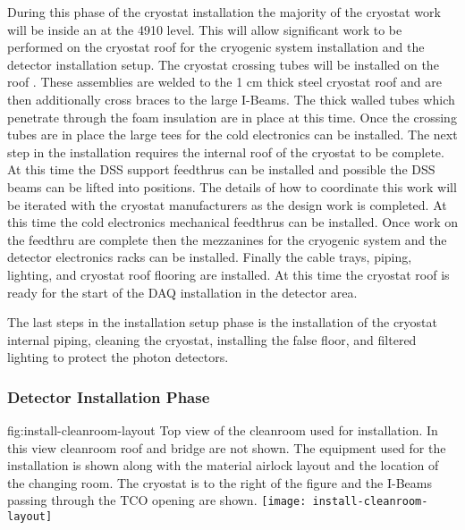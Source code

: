 During this phase of the cryostat installation the majority of the cryostat work will be inside an at the 4910 level. 
This will allow significant work to be performed on the cryostat roof for the cryogenic system installation and the detector installation setup. 
The cryostat crossing tubes will be installed on the roof 
 . 
These assemblies are welded to the 1 \si{cm} thick steel cryostat roof and are then additionally cross braces to the large I-Beams. 
The thick walled tubes which penetrate through the foam insulation are in place at this time. 
Once the crossing tubes are in place the large tees for the cold electronics can be installed. 
The next step in the installation requires the internal roof of the cryostat to be complete. 
At this time the DSS support feedthrus can be installed and possible the DSS beams can be lifted into positions. 
The details of how to coordinate this work will be iterated with the cryostat manufacturers as the design work is completed. 
At this time the cold electronics mechanical feedthrus can be installed. 
Once work on the feedthru are complete then the mezzanines for the cryogenic system and the detector electronics racks can be installed.
Finally the cable trays,  piping, lighting, and cryostat roof flooring are installed. 
At this time the cryostat roof is ready for the start of the DAQ installation in the detector area.

The last steps in the installation setup phase is the installation of the cryostat internal piping, cleaning the cryostat, installing the false floor, and filtered lighting to protect the photon detectors. 



\subsubsection{Detector Installation Phase}

\begin{dunefigure}{fig:install-cleanroom-layout}
  {Top view of the cleanroom used for installation. In this view cleanroom roof and bridge are not shown. The equipment used for the installation is shown along with the material airlock layout and the location of the changing room. The cryostat is to the right of the figure and the I-Beams passing through the TCO opening are shown.}
 \texttt{[image: install-cleanroom-layout]}
\end{dunefigure}


